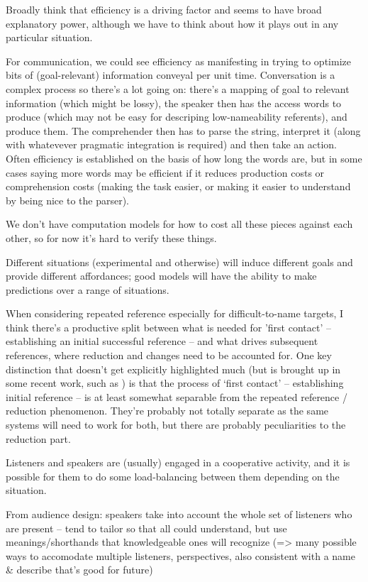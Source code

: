 \documentclass[]{article}
\begin{document}
Broadly think that efficiency is a driving factor and seems to have broad explanatory power, although we have to think about how it plays out in any particular situation. 

For communication, we could see efficiency as manifesting in trying to optimize bits of (goal-relevant) information conveyal per unit time. Conversation is a complex process so there's a lot going on: there's a mapping of goal to relevant information (which might be lossy), the speaker then has the access words to produce (which may not be easy for descriping low-nameability referents), and produce them. The comprehender then has to parse the string, interpret it (along with whatevever pragmatic integration is required) and then take an action. Often efficiency is established on the basis of how long the words are, but in some cases saying more words may be efficient if it reduces production costs or comprehension costs (making the task easier, or making it easier to understand by being nice to the parser). 

We don't have computation models for how to cost all these pieces against each other, so for now it's hard to verify these things. 

Different situations (experimental and otherwise) will induce different goals and provide different affordances; good models will have the ability to make predictions over a range of situations. 


When considering repeated reference especially for difficult-to-name targets, I think there's a productive split between what is needed for 'first contact' -- establishing an initial successful reference -- and what drives subsequent references, where reduction and changes need to be accounted for. One key distinction that doesn't get explicitly highlighted much (but is brought up in some recent work, such as \cite{leung2023}) is that the process of `first contact' -- establishing initial reference -- is at least somewhat separable from the repeated reference / reduction phenomenon. They're probably not totally separate as the same systems will need to work for both, but there are probably peculiarities to the reduction part. 

Listeners and speakers are (usually) engaged in a cooperative activity, and it is possible for them to do some load-balancing between them depending on the situation. 

From audience design: speakers take into account the whole set of listeners who are present -- tend to tailor so that all could understand, but use meanings/shorthands that knowledgeable ones will recognize (=> many possible ways to accomodate multiple listeners, perspectives, also consistent with a name \& describe that's good for future) 
\end{document}
